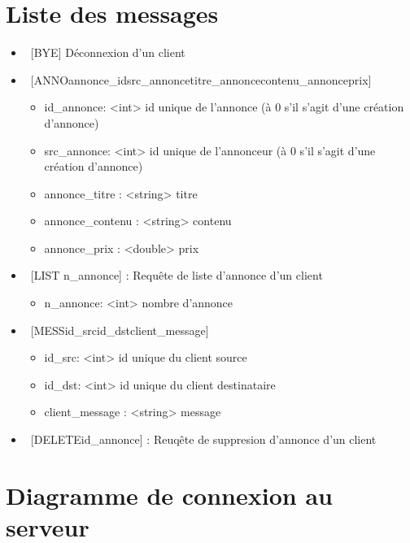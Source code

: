 \documentclass[12pt]{article}
\begin{document}
\section{Liste des messages}

\begin{itemize}
  \item~[BYE]  Déconnexion d'un client
  \item~[ANNO\separator{}annonce\_id\separator{}src\_annonce\separator{}titre\_annonce\separator{}contenu\_annonce\separator{}prix]
  \begin{itemize}
    \item id\_annonce: <int>  id unique de l'annonce (à 0 s'il s'agit d'une création d'annonce)
    \item src\_annonce: <int> id unique de l'annonceur (à 0 s'il s'agit d'une création d'annonce)
    \item annonce\_titre : <string> titre
    \item annonce\_contenu : <string> contenu
    \item annonce\_prix : <double> prix
  \end{itemize}
  \item~[LIST n\_annonce] : Requête de liste d'annonce d'un client
  \begin{itemize}
    \item n\_annonce: <int> nombre d'annonce
  \end{itemize}
  \item~[MESS\separator{}id\_src\separator{}id\_dst\separator{}client\_message]
  \begin{itemize}
    \item id\_src: <int> id unique du client source
    \item id\_dst: <int> id unique du client destinataire
    \item client\_message : <string> message
  \end{itemize}
  \item~[DELETE\separator{}id\_annonce] : Reuqête de suppresion d'annonce d'un client
\end{itemize}


\section{Diagramme de connexion au serveur}
\end{document}
